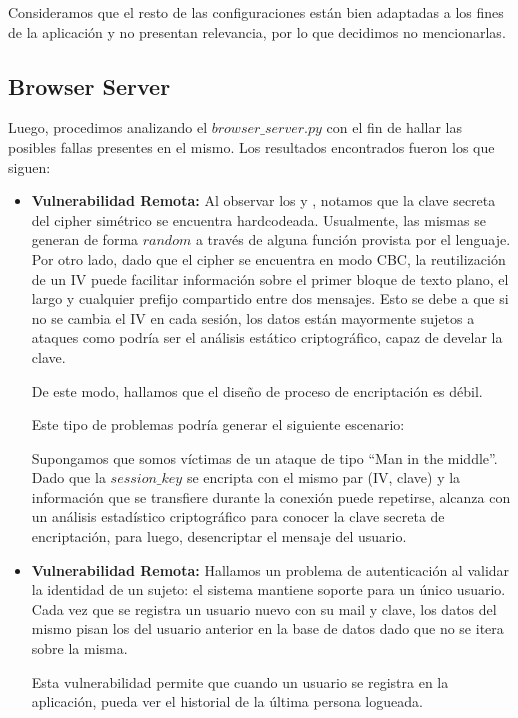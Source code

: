 \documentclass[10pt, a4paper]{article}
\begin{document}
Consideramos que el resto de las configuraciones están bien adaptadas a los fines de la aplicación y no presentan relevancia, por lo que decidimos no mencionarlas.

\newpage
\subsection{Browser Server}
Luego, procedimos analizando el $browser\_server.py$ con el fin de hallar las posibles fallas presentes en el mismo. Los resultados encontrados fueron los que siguen:

\begin{itemize}

\item \textbf{Vulnerabilidad Remota:} Al observar los  y , notamos que la clave secreta del cipher simétrico se encuentra hardcodeada. Usualmente, las mismas se generan de forma $random$ a través de alguna función provista por el lenguaje. 
Por otro lado, dado que el cipher se encuentra en modo CBC, la reutilización de un IV puede facilitar información sobre el primer bloque de texto plano, el largo y cualquier prefijo compartido entre dos mensajes.
Esto se debe a que si no se cambia el IV en cada sesión, los datos están mayormente sujetos a ataques como podría ser el análisis estático criptográfico, capaz de develar la clave. 

De este modo, hallamos que el diseño de proceso de encriptación es débil.

Este tipo de problemas podría generar el siguiente escenario:

Supongamos que somos víctimas de un ataque de tipo ``Man in the middle''. Dado que la $session\_key$ se encripta con el mismo par (IV, clave) y la información que se transfiere durante la conexión puede repetirse, alcanza con un análisis estadístico criptográfico para conocer la clave secreta de encriptación, para luego, desencriptar el mensaje del usuario.

\item \textbf{Vulnerabilidad Remota:} Hallamos un problema de autenticación al validar la identidad de un sujeto: el sistema mantiene soporte para un único usuario. Cada vez que se registra un usuario nuevo con su mail y clave, los datos del mismo pisan los del usuario anterior en la base de datos dado que no se itera sobre la misma.

Esta vulnerabilidad permite que cuando un usuario se registra en la aplicación, pueda ver el historial de la última persona logueada.


\end{itemize}
\end{document}
